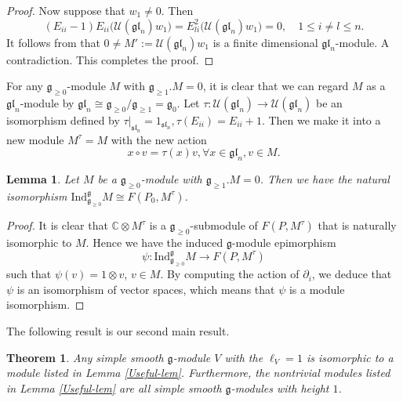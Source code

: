 \documentclass[12pt, a4paper]{amsart}
\newcommand{\fg}{\mathfrak g}
\newcommand{\C}{\mathbb{C}}
\newcommand{\U}{\mathcal{U}}
\def\sl{\mathfrak{sl}}
\def\gl{\mathfrak{gl}}
\theoremstyle{Theorem}
\theoremstyle{Theorem}
\newtheorem{lemma}[thm]{Lemma}
\newtheorem{theorem}[thm]{Theorem}
\numberwithin{equation}{section}
\begin{document}
\begin{proof}
	Now suppose that $w_1\ne 0$. Then
	$$(E_{ii}-1)E_{ii}\big(\U(\gl_n)w_1\big)=E_{li}^{2}\big(\U(\gl_n)w_1\big)=0,\quad 1\leq i\neq l\leq n.$$
	It follows from \cite[Lemma 2.3]{LZ} that $0\ne M':=\U(\gl_n)w_1$ is a finite dimensional $\gl_n$-module. A contradiction.
	This completes the proof.
\end{proof}

For any $\fg_{\ge 0}$-module $M$ with $\fg_{\ge1}.M=0$, it is clear that we can regard
$M$ as a $\gl_n$-module by $\gl_n\cong\fg_{\ge 0}/\fg_{\ge 1}=\fg_0$.
Let $\tau:\U(\gl_n)\rightarrow \U(\gl_n)$ be an isomorphism defined by
$\tau|_{\sl_n}=1_{\sl_n},\tau(E_{ii})=E_{ii}+1$. Then we make it into a new module $M^{\tau}=M$
with the new action 
$$x\circ v=\tau(x)v, \forall x\in\gl_n, v\in M.$$

\begin{lemma}\label{iso}Let $M$ be a $\fg_{\ge 0}$-module with $\fg_{\ge1}.M=0$. Then we have the natural isomorphism $\mathrm{Ind}_{\fg_{\ge 0}}^{\fg} M\cong F(P_0,M^{\tau})$.\end{lemma}

\begin{proof}It is clear that $\C\otimes M^{\tau}$ is a $\fg_{\ge 0}$-submodule of $F(P,M^{\tau})$
that is naturally isomorphic to $M$. Hence we have the induced $\fg$-module epimorphism
\[\psi:\mathrm{Ind}_{\fg_{\ge 0}}^{\fg} M\rightarrow F(P,M^{\tau})\]such that $\psi(v)=1\otimes v$, $v\in M$.
By computing  the action of $\partial_i$, we deduce that $\psi$ is an isomorphism of vector spaces,
which means that $\psi$ is a module  isomorphism.\end{proof}


The following result is our second main result.
\begin{theorem}\label{the second main-result} Any simple smooth $\fg$-module $V$ with the $\ell_{V}=1$ is isomorphic
to a   module   listed in Lemma \ref{Useful-lem}. Furthermore, the nontrivial modules listed in Lemma \ref{Useful-lem} are all simple smooth $\fg$-modules with height $1$.\end{theorem}
\end{document}

